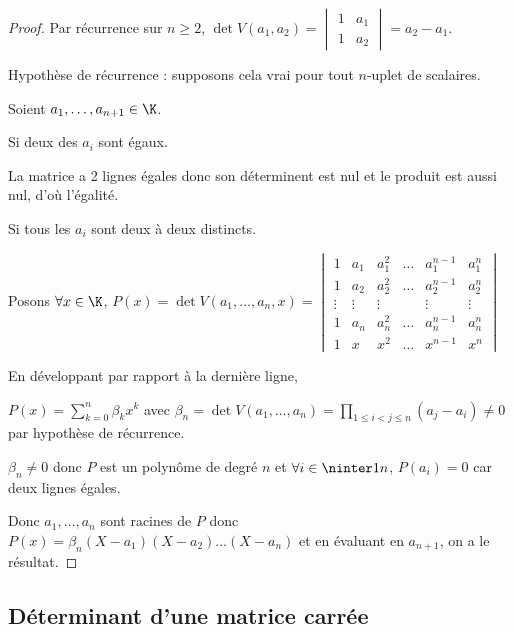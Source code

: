 
\begin{proof}
    Par récurrence sur $n \geqslant 2$, $\det V(a_1, a_2) = \begin{vmatrix}
        1 & a_1 \\
        1 & a_2
    \end{vmatrix} = a_2 - a_1$.

    Hypothèse de récurrence : supposons cela vrai pour tout $n$-uplet de scalaires. 

    Soient $a_1, \dots, a_{n+1} \in \K$.

     Si deux des $a_i$ sont égaux. 

    \svspace La matrice a 2 lignes égales donc son déterminent est nul et le produit est aussi nul, d'où l'égalité. 

     Si tous les $a_i$ sont deux à deux distincts.

    Posons $\forall x \in \K$, $P(x) = \det V(a_1, \dots, a_n, x) = \begin{vmatrix}
        1 & a_1 & a_1^2 & \dots & a_1^{n-1} & a_1^n \\
        1 & a_2 & a_2^2 & \dots & a_2^{n-1} & a_2^n \\
        \vdots & \vdots & \vdots & & \vdots & \vdots \\
        1 & a_n & a_n^2 & \dots & a_n^{n-1} & a_n^n \\
        1 & x & x^2 & \dots & x^{n-1} & x^n
    \end{vmatrix}$

    En développant par rapport à la dernière ligne, 
    
    $P(x) = \displaystyle \sum_{k=0}^n \beta_k x^k$ avec 
    $\beta_n = \det V(a_1, \dots, a_n) = \prod_{1 \leqslant i < j \leqslant n} (a_j - a_i) \neq 0$ par 
    hypothèse de récurrence.

    $\beta_n \neq 0$ donc $P$ est un polynôme de degré $n$ et $\forall i \in \ninter 1 n$, $P(a_i) = 0$ car deux lignes égales.

    Donc $a_1, \dots, a_n$ sont racines de $P$ donc
    $P(x) = \beta_n (X - a_1)(X - a_2) \dots (X - a_n)$ et 
    en évaluant en $a_{n+1}$, on a le résultat. 
\end{proof}

\subsection{Déterminant d'une matrice carrée}

